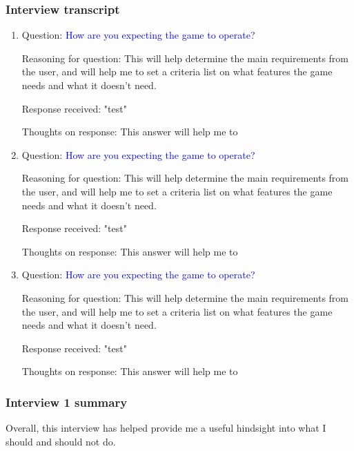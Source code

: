 \documentclass[11pt,a4paper]{report}
\begin{document}
\subsubsection{Interview transcript}
\begin{enumerate}
    \item \colorbox{l-blue}{Question:} \textcolor{blue}{How are you expecting the game to operate?}

    \colorbox{l-green}{Reasoning for question:} \textcolor{dark-green}{This will help determine the main requirements from the user, and will help me to set a criteria list on what features the game needs and what it doesn't need.}

    \colorbox{l-red}{Response received:} \noindent \textcolor{crimson-red}{"test"}

    \colorbox{l-purple}{Thoughts on response:} \noindent \textcolor{d-purple}{This answer will help me to}

    \item \colorbox{l-blue}{Question:} \textcolor{blue}{How are you expecting the game to operate?}

    \colorbox{l-green}{Reasoning for question:} \textcolor{dark-green}{This will help determine the main requirements from the user, and will help me to set a criteria list on what features the game needs and what it doesn't need.}

    \colorbox{l-red}{Response received:} \noindent \textcolor{crimson-red}{"test"}

    \colorbox{l-purple}{Thoughts on response:} \noindent \textcolor{d-purple}{This answer will help me to}

    \item \colorbox{l-blue}{Question:} \textcolor{blue}{How are you expecting the game to operate?}

    \colorbox{l-green}{Reasoning for question:} \textcolor{dark-green}{This will help determine the main requirements from the user, and will help me to set a criteria list on what features the game needs and what it doesn't need.}

    \colorbox{l-red}{Response received:} \noindent \textcolor{crimson-red}{"test"}

    \colorbox{l-purple}{Thoughts on response:} \noindent \textcolor{d-purple}{This answer will help me to}


\end{enumerate}

\subsubsection{Interview 1 summary}
Overall, this interview has helped provide me a useful hindsight into what I should and should not do.
\end{document}
